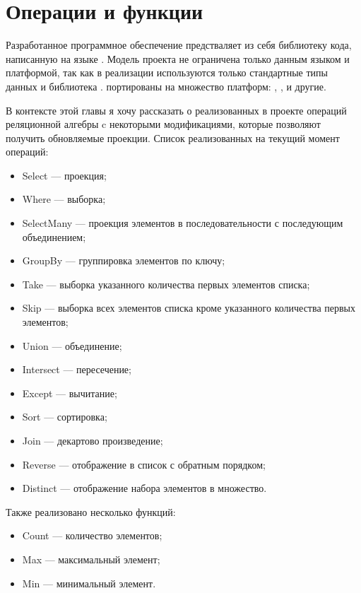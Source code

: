 \section{Операции и функции}
\label{sec:development}

Разработанное программное обеспечение предстваляет из себя библиотеку кода,
написанную на языке \csharp{}. Модель проекта не ограничена только данным языком и платформой,
так как в реализации используются только стандартные типы данных и библиотека \rx{}.
\rx{} портированы на множество платформ: \java{}, \javascript{}, \python{} и другие.

В контексте этой главы я хочу рассказать о реализованных в проекте операций реляционной алгебры c некоторыми модификациями,
которые позволяют получить обновляемые проекции. Список реализованных на текущий момент операций:

\begin{itemize}
  \item Select --- проекция;
  \item Where --- выборка;
  \item SelectMany --- проекция элементов в последовательности с последующим объединением;
  \item GroupBy --- группировка элементов по ключу;
  \item Take --- выборка указанного количества первых элементов списка;
  \item Skip --- выборка всех элементов списка кроме указанного количества первых элементов;
  \item Union --- объединение;
  \item Intersect --- пересечение;
  \item Except --- вычитание;
  \item Sort --- сортировка;
  \item Join --- декартово произведение;
  \item Reverse --- отображение в список с обратным порядком;
  \item Distinct --- отображение набора элементов в множество.
\end{itemize}

Также реализовано несколько функций:

\begin{itemize}
  \item Count --- количество элементов;
  \item Max --- максимальный элемент;
  \item Min --- минимальный элемент.
\end{itemize}

